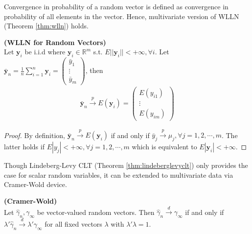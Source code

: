 \documentclass[11pt]{article} %
\theoremstyle{definition}
\numberwithin{defn}{subsection}
\numberwithin{thm}{subsection}
\numberwithin{ex}{subsection}
\newcommand{\bb}[1]{\mathbb{#1}}
\newcommand{\R}{\bb{R}}
\newcommand{\plim}{\overset{p}{\rightarrow}}
\newcommand{\dlim}{\overset{d}{\rightarrow}}
\begin{document}
Convergence in probability of a random vector is defined as convergence in probability of all elements in the vector. Hence, multivariate version of WLLN (Theorem \ref{thm:wlln}) holds.

\begin{thm}\label{thm:wlln(vector)}
	\textbf{(WLLN for Random Vectors)}\\
	Let $\bm{y}_i$ be i.i.d where $\bm{y}_i\in\R^m$ s.t. $E||\bm{y}_i||<+\infty,\forall i$. Let $\bar{\bm{y}}_n=\frac{1}{n}\sum_{i=1}^n \bm{y}_i=\begin{pmatrix}
	\bar{y}_1\\\vdots\\\bar{y}_m\end{pmatrix}$, then 
	\begin{align*}
	\bar{\bm{y}}_n\overset{p}{\rightarrow}E(\bm{y}_i)=\begin{pmatrix}E(y_{i1})\\\vdots\\E(y_{im})\end{pmatrix}
	\end{align*}
	\begin{proof}
		By definition, $\bar{\bm{y}}_n\plim E(\bm{y}_i)$ if and only if $\bar{y}_j\plim \mu_j,\forall j=1,2,\cdots,m$. The latter holds if $E|y_j|<+\infty,\forall j=1,2,\cdots,m$ which is equivalent to $E|\bm{y}_i|<+\infty$.
	\end{proof}
\end{thm}

Though Lindeberg-Levy CLT (Theorem \ref{thm:lindeberglevyclt}) only provides the case for scalar random variables, it can be extended to multivariate data via Cramer-Wold device.

\begin{thm}\label{thm:cramerwold}
	\textbf{(Cramer-Wold)}	\\
	Let $\hat{\gamma}_n,\gamma_{\infty}$ be vector-valued random vectors. Then $\hat{\gamma}_n\dlim \gamma_{\infty}$ if and only if $\lambda'\hat{\gamma}_n\dlim\lambda'\gamma_{\infty}$ for all fixed vectors $\lambda$ with $\lambda'\lambda=1$.
\end{thm}

\end{document}
